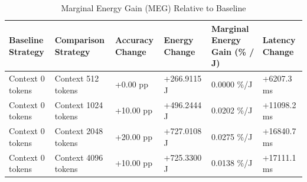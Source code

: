 \begin{table}
\caption{Marginal Energy Gain (MEG) Relative to Baseline}
\label{tab:marginal_energy_gain}
\begin{tabular}{llllll}
\toprule
Baseline Strategy & Comparison Strategy & Accuracy Change & Energy Change & Marginal Energy Gain (\% / J) & Latency Change \\
\midrule
Context 0 tokens & Context 512 tokens & +0.00 pp & +266.9115 J & 0.0000 \%/J & +6207.3 ms \\
Context 0 tokens & Context 1024 tokens & +10.00 pp & +496.2444 J & 0.0202 \%/J & +11098.2 ms \\
Context 0 tokens & Context 2048 tokens & +20.00 pp & +727.0108 J & 0.0275 \%/J & +16840.7 ms \\
Context 0 tokens & Context 4096 tokens & +10.00 pp & +725.3300 J & 0.0138 \%/J & +17111.1 ms \\
\bottomrule
\end{tabular}
\end{table}
